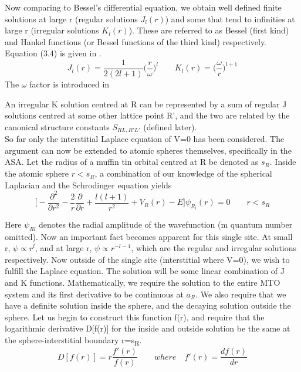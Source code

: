 \documentclass[12pt]{article}
\begin{document}
Now comparing to Bessel's differential equation, we obtain well defined finite solutions at large r (regular solutions $J_l(r)$) and some that tend to infinities at large r (irregular solutions $K_l(r)$). These are referred to as Bessel (first kind) and Hankel functions (or Bessel functions of the third kind) respectively. Equation (3.4) is given in \cite{turek}. 
\begin{equation} \label{3.4} \tag{3.4}
J_l(r)=\frac{1}{2(2l+1)}\bigg(\frac{r}{\omega}\bigg)^l \qquad K_l(r)=\bigg(\frac{\omega}{r}\bigg)^{l+1}
\end{equation}
The $\omega$ factor is introduced in \cite{andersen} 

An irregular K solution centred at R can be represented by a sum of regular J solutions centred at some other lattice point R', and the two are related by the canonical structure constants $S_{RL,R'L'}$ (defined later).
\\
So far only the interstitial Laplace equation of V=0 has been considered. The argument can now be extended to atomic spheres themselves, specifically in the ASA. Let the radius of a muffin tin orbital centred at R be denoted as $s_R$. Inside the atomic sphere $r<s_R$, a combination of our knowledge of the spherical Laplacian and the Schrodinger equation yields
\begin{equation} \label{3.5} \tag{3.5}
\bigg[-\frac{\partial^2}{\partial r^2}-\frac{2}{r}\frac{\partial}{\partial r}+\frac{l(l+1)}{r^2}+V_R(r)-E \bigg] \psi_R_l(r)=0 \qquad r<s_R
\end{equation}

Here $\psi_{Rl}$ denotes the radial amplitude of the wavefunction (m quantum number omitted). Now an important fact becomes apparent for this single site. At small r, $\psi \propto r^l$, and at large r, $\psi \propto r^{-l-1}$, which are the regular and irregular solutions respectively. Now outside of the single site (interstitial where V=0), we wish to fulfill the Laplace equation. The solution will be some linear combination of J and K functions. Mathematically, we require the solution to the entire MTO system and its first derivative to be continuous at $a_R$. We also require that we have a definite solution inside the sphere, and the decaying solution outside the sphere. Let us begin to construct this function f(r), and require that the logarithmic derivative D[f(r)] for the inside and outside solution be the same at the sphere-interstitial boundary r=s\textsubscript{R}. 
\begin{equation} \label{3.6} \tag{3.6}
D[f(r)]= r \frac{f'(r)}{f(r)} \qquad where \quad f'(r)=\frac{df(r)}{dr}
\end{equation}
\end{document}
